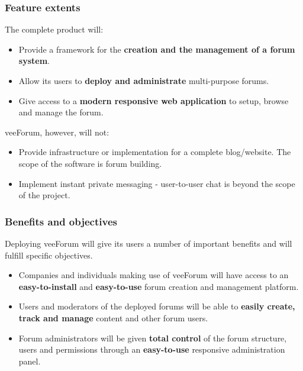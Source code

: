 \documentclass[12pt]{report}
\renewcommand\emph{\textbf}
\begin{document}
                    \subsubsection{Feature extents}

                        The complete product will:

                        \begin{itemize}
                            \item Provide a framework for the \emph{creation and the management of a forum system}.
                            \item Allow its users to \emph{deploy and administrate} multi-purpose forums.
                            \item Give access to a \emph{modern responsive web application} to setup, browse and manage the forum.
                        \end{itemize}

                        veeForum, however, will not:

                        \begin{itemize}
                            \item Provide infrastructure or implementation for a complete blog/website. The scope of the software is forum building.
                            \item Implement instant private messaging - user-to-user chat is beyond the scope of the project.
                        \end{itemize}

                    \subsubsection{Benefits and objectives}

                        Deploying veeForum will give its users a number of important benefits and will fulfill specific objectives.

                        \begin{itemize}
                            \item Companies and individuals making use of veeForum will have access to an \emph{easy-to-install} and \emph{easy-to-use} forum creation and management platform.
                            \item Users and moderators of the deployed forums will be able to \emph{easily create, track and manage} content and other forum users.
                            \item Forum administrators will be given \emph{total control} of the forum structure, users and permissions through an \emph{easy-to-use} responsive administration panel.
                        \end{itemize}
\end{document}
